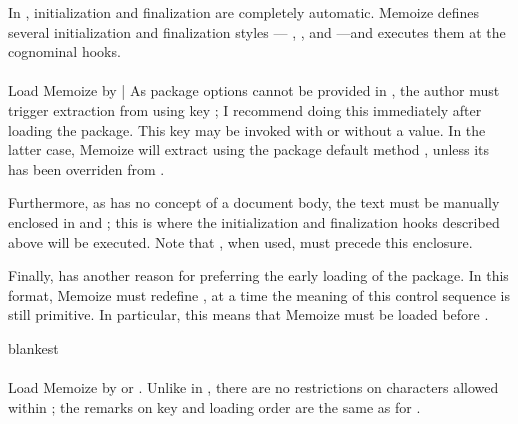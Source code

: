 \documentclass[a4paper,11pt]{article}
\begin{document}
In , initialization and finalization are completely automatic.
Memoize defines several initialization and finalization styles ---
, ,
 and 
---and executes them at the cognominal  hooks.

\paragraph{}{}

Load Memoize by |  As package options cannot be provided in
, the author must trigger extraction from 
using key ; I recommend doing this immediately after loading
the package.  This key may be invoked with or without a value.  In the latter
case, Memoize will extract using the package default method
, unless its has been overriden from
.

Furthermore, as  has no concept of a document body, the text
must be manually enclosed in  and ; this
is where the initialization and finalization hooks described above will be
executed.  Note that , when used, must precede this enclosure.

Finally,  has another reason for preferring the early loading
of the package.  In this format, Memoize must redefine , at a
time the meaning of this control sequence is still primitive.  In particular,
this means that Memoize must be loaded before .

\begin{tcboxedraster}[raster column skip=1cm]{blankest}
\end{tcboxedraster}

\paragraph{}{}

Load Memoize by  or
.  Unlike in ,
there are no restrictions on characters allowed within ; the
remarks on key  and loading order are the same as for
.
\end{document}
